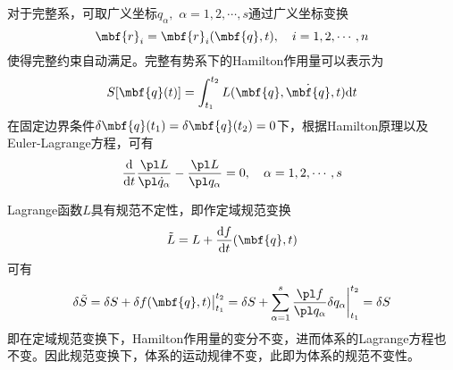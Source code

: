 对于完整系，可取广义坐标$q_\alpha,\,\,\alpha = 1,2,\cdots,s$通过广义坐标变换
\begin{equation*}
	\mbf{r}_i = \mbf{r}_i(\mbf{q},t),\quad i=1,2,\cdots,n
\end{equation*}
使得完整约束自动满足。完整有势系下的Hamilton作用量可以表示为
\begin{equation}
	S[\mbf{q}(t)] = \int_{t_1}^{t_2} L(\mbf{q},\dot{\mbf{q}},t) \mathrm{d} t
\end{equation}
在固定边界条件$\delta \mbf{q}(t_1) = \delta \mbf{q}(t_2) = 0$下，根据Hamilton原理以及Euler-Lagrange方程，可有
\begin{equation}
	\frac{\mathrm{d}}{\mathrm{d} t} \frac{\pl L}{\pl \dot{q}_\alpha} - \frac{\pl L}{\pl q_\alpha} = 0,\quad \alpha = 1,2,\cdots,s
\end{equation}

Lagrange函数$L$具有规范不定性，即作{\heiti 定域规范变换}
\begin{equation}
	\tilde{L} = L + \frac{\mathrm{d} f}{\mathrm{d} t}(\mbf{q},t)
\end{equation}
可有
\begin{equation*}
	\delta \tilde{S} = \delta S + \delta f(\mbf{q},t)\big|_{t_1}^{t_2} = \delta S + \sum_{\alpha=1}^s \frac{\pl f}{\pl q_\alpha} \delta q_\alpha \bigg|_{t_1}^{t_2} = \delta S
\end{equation*}
即在定域规范变换下，Hamilton作用量的变分不变，进而体系的Lagrange方程也不变。因此规范变换下，体系的运动规律不变，此即为体系的{\heiti 规范不变性}。

